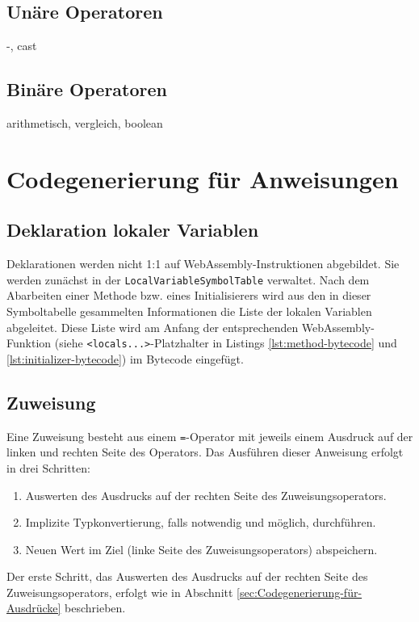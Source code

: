 

\subsection{Unäre Operatoren}
-, cast
\subsection{Binäre Operatoren}
arithmetisch, vergleich, boolean

\section{Codegenerierung für Anweisungen}

\subsection{Deklaration lokaler Variablen}

Deklarationen werden nicht 1:1 auf WebAssembly-Instruktionen abgebildet. Sie werden zunächst in der \lstinline{LocalVariableSymbolTable} verwaltet. Nach dem Abarbeiten einer Methode bzw. eines Initialisierers wird aus den in dieser Symboltabelle gesammelten Informationen die Liste der lokalen Variablen abgeleitet. Diese Liste wird am Anfang der entsprechenden WebAssembly-Funktion (siehe \lstinline{<locals...>}-Platzhalter in Listings \ref{lst:method-bytecode} und \ref{lst:initializer-bytecode}) im Bytecode eingefügt.

\subsection{Zuweisung}
Eine Zuweisung besteht aus einem \lstinline{=}-Operator mit jeweils einem Ausdruck auf der linken und rechten Seite des Operators. Das Ausführen dieser Anweisung erfolgt in drei Schritten:
\begin{enumerate}
    \item Auswerten des Ausdrucks auf der rechten Seite des Zuweisungsoperators.
    \item Implizite Typkonvertierung, falls notwendig und möglich, durchführen.
    \item Neuen Wert im Ziel (linke Seite des Zuweisungsoperators) abspeichern.
\end{enumerate}

Der erste Schritt, das Auswerten des Ausdrucks auf der rechten Seite des Zuweisungsoperators, erfolgt wie in Abschnitt \ref{sec:Codegenerierung-für-Ausdrücke} beschrieben.

